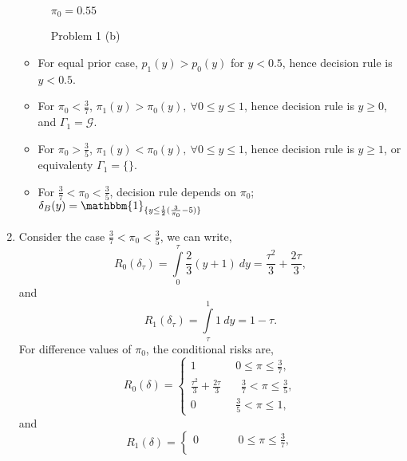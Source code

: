 \documentclass[a4paper,english,10pt]{article}
\begin{document}
\begin{enumerate}[label=(\alph*).]
\begin{figure*}
\begin{minipage}[b]{.45\textwidth}
			\centerline{$\pi_0=0.55$}
\end{minipage}
\caption{Problem 1 (b)}
\end{figure*}
\begin{itemize}
	\item For equal prior case, $p_1(y)>p_0(y)$ for $y<0.5$, hence decision rule is $y<0.5$.
	\item For $\pi_0<\frac{3}{7}$, $\pi_1(y)>\pi_0(y),~\forall 0 \leq y \leq 1$, hence decision rule is $y\geq 0$, and $\Gamma_1=\mathcal{G}$.		 
	\item For $\pi_0>\frac{3}{5}$, $\pi_1(y)<\pi_0(y),~\forall 0 \leq y \leq 1$, hence decision rule is $y \geq 1$, or equivalenty $\Gamma_1=\{\}$.		 	
	\item For $\frac{3}{7}<\pi_0<\frac{3}{5}$, decision rule depends on $\pi_0$; $\delta_B(y)=\mathbbm{1}_{\{y\leq \frac{1}{2}(\frac{3}{\pi_0}-5)\}}$
\end{itemize}
\item Consider the case $\frac{3}{7}<\pi_0<\frac{3}{5}$, we can write,
\begin{equation*}
	R_0(\delta_\tau)=\int\limits_{0}^{\tau} \frac{2}{3}(y+1)~dy=\frac{\tau^2}{3}+\frac{2\tau}{3},
\end{equation*}
and
\begin{equation*}
	R_1(\delta_\tau)=\int\limits_{\tau}^{1} 1~dy=1-\tau.
\end{equation*}
For difference values of $\pi_0$, the conditional risks are,
\begin{equation*}
	R_0({\delta})=\begin{cases}
		1~~~~~~~~~~~~~~~~0\leq \pi \leq \frac{3}{7}, \\
		\frac{\tau^2}{3}+\frac{2\tau}{3}~~~~~~~~\frac{3}{7} < \pi \leq \frac{3}{5}, \\
		0~~~~~~~~~~~~~~~~\frac{3}{5} < \pi \leq 1, 
	\end{cases}
\end{equation*}
and
\begin{equation*}
	R_1({\delta})=\begin{cases}
		0~~~~~~~~~~~~~~~~0\leq \pi \leq \frac{3}{7}, \\

\end{cases}
\end{equation*}
\end{enumerate}
\end{document}
